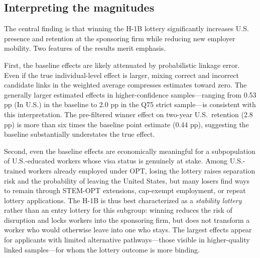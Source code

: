 \subsection{Interpreting the magnitudes}

The central finding is that winning the H-1B lottery significantly increases U.S. presence and retention at the sponsoring firm while reducing new employer mobility. Two features of the results merit emphasis.

First, the baseline effects are likely attenuated by probabilistic linkage error. Even if the true individual-level effect is larger, mixing correct and incorrect candidate links in the weighted average compresses estimates toward zero. The generally larger estimated effects in higher-confidence samples---ranging from 0.53 pp (In U.S.) in the baseline to 2.0 pp in the Q75 strict sample---is consistent with this interpretation. The pre-filtered winner effect on two-year U.S.\ retention (2.8 pp) is more than six times the baseline point estimate (0.44 pp), suggesting the baseline substantially understates the true effect.

Second, even the baseline effects are economically meaningful for a subpopulation of U.S.-educated workers whose visa status is genuinely at stake. Among U.S.-trained workers already employed under OPT, losing the lottery raises separation risk and the probability of leaving the United States, but many losers find ways to remain through STEM-OPT extensions, cap-exempt employment, or repeat lottery applications. The H-1B is thus best characterized as a \textit{stability lottery} rather than an entry lottery for this subgroup: winning reduces the risk of disruption and locks workers into the sponsoring firm, but does not transform a worker who would otherwise leave into one who stays. The largest effects appear for applicants with limited alternative pathways---those visible in higher-quality linked samples---for whom the lottery outcome is more binding.
